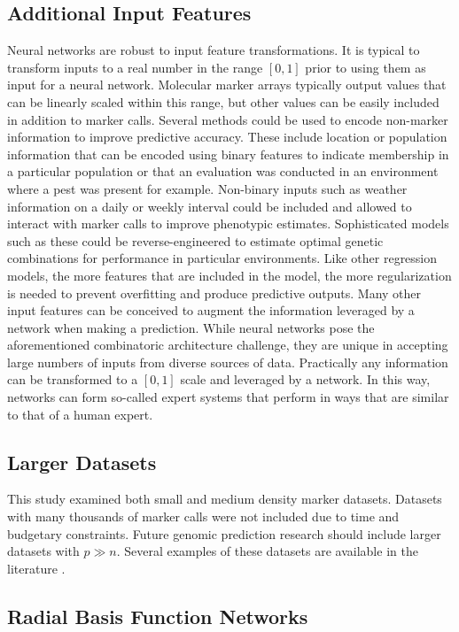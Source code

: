 \subsection*{Additional Input Features}

Neural networks are robust to input feature transformations. It is typical 
to transform inputs to a real number in the range $[0,1]$ prior to using them
as input for a neural network. Molecular marker arrays typically output values that
can be linearly scaled within this range, but other values can be easily included
in addition to marker calls. Several methods could be used to encode non-marker information
to improve predictive accuracy. These include location or population information that can
be encoded using binary features to indicate membership in a particular population
or that an evaluation was conducted in an environment where a pest was present for example.
Non-binary inputs such as weather information on a daily or weekly interval could be 
included and allowed to interact with marker calls to improve phenotypic estimates.
Sophisticated models such as these could be reverse-engineered to estimate optimal
genetic combinations for performance in particular environments. Like other regression
models, the more features that are included in the model, the more regularization is needed
to prevent overfitting and produce predictive outputs. Many other input features
can be conceived to augment the information leveraged by a network when making
a prediction. While neural networks pose the aforementioned combinatoric architecture
challenge, they are unique in accepting large numbers of inputs from diverse 
sources of data. Practically any information can be transformed to 
a $[0,1]$ scale and leveraged by a network. In this way, networks can 
form so-called expert systems that perform in ways that are similar to 
that of a human expert.

\subsection*{Larger Datasets}

This study examined both small and medium density marker datasets. Datasets with
many thousands of marker calls were not included due to time and budgetary constraints.
Future genomic prediction research should include larger datasets with $p \gg n$. Several
examples of these datasets are available in the literature \citep{resende2012, cleveland2012}.

\subsection*{Radial Basis Function Networks}

